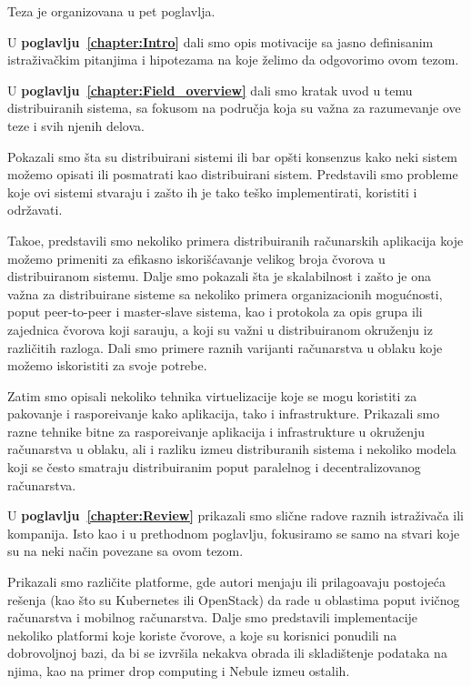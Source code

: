 \noindent
Teza je organizovana u pet poglavlja.

U \textbf{poglavlju~\ref{chapter:Intro}} dali smo opis motivacije sa jasno definisanim istra\v ziva\v ckim pitanjima i hipotezama na koje \v zelimo da odgovorimo ovom tezom.

U \textbf{poglavlju~\ref{chapter:Field_overview}} dali smo kratak uvod u temu distribuiranih sistema, sa fokusom na podru\v cja koja su va\v zna za razumevanje ove teze i svih njenih delova.

Pokazali smo \v sta su distribuirani sistemi ili bar op\v sti konsenzus kako neki sistem mo\v zemo opisati ili posmatrati kao distribuirani sistem. Predstavili smo probleme koje ovi sistemi stvaraju i za\v sto ih je tako te\v sko implementirati, koristiti i odr\v zavati.

Tako\dj e, predstavili smo nekoliko primera distribuiranih ra\v cunarskih aplikacija koje mo\v zemo primeniti za efikasno iskori\v s\'cavanje velikog broja \v cvorova u distribuiranom sistemu. Dalje smo pokazali \v sta je skalabilnost i za\v sto je ona va\v zna za distribuirane sisteme sa nekoliko primera organizacionih mogu\'cnosti, poput peer-to-peer i master-slave sistema, kao i protokola za opis grupa ili zajednica \v cvorova koji sara\dj uju, a koji su va\v zni u distribuiranom okru\v zenju iz razli\v citih razloga. Dali smo primere raznih varijanti ra\v cunarstva u oblaku koje mo\v zemo iskoristiti za svoje potrebe.

Zatim smo opisali nekoliko tehnika virtuelizacije koje se mogu koristiti za pakovanje i raspore\dj ivanje kako aplikacija, tako i infrastrukture. Prikazali smo razne tehnike bitne za raspore\dj ivanje aplikacija i infrastrukture u okru\v zenju ra\v cunarstva u oblaku, ali i razliku izme\dj u distriburanih sistema i nekoliko modela koji se \v cesto smatraju distribuiranim poput paralelnog i decentralizovanog ra\v cunarstva.

U \textbf{poglavlju~\ref{chapter:Review}} prikazali smo sli\v cne radove raznih istra\v ziva\v ca ili kompanija. Isto kao i u prethodnom poglavlju, fokusiramo se samo na stvari koje su na neki na\v cin povezane sa ovom tezom.

Prikazali smo razli\v cite platforme, gde autori menjaju ili prilago\dj avaju postoje\'ca re\v senja (kao \v sto su Kubernetes ili OpenStack) da rade u oblastima poput ivi\v cnog ra\v cunarstva i mobilnog ra\v cunarstva. Dalje smo predstavili implementacije nekoliko platformi koje koriste \v cvorove, a koje su korisnici ponudili na dobrovoljnoj bazi, da bi se izvr\v sila nekakva obrada ili skladi\v stenje podataka na njima, kao na primer drop computing i Nebule izme\dj u ostalih.

